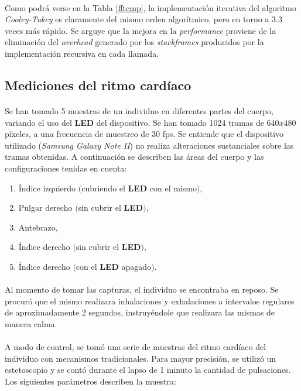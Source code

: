 \documentclass[12pt, twocolumn]{article}
\begin{document}
	\paragraph{} Como podrá verse en la Tabla \ref{fftcmp}, la implementación iterativa del algoritmo \textit{Cooley-Tukey} es claramente del mismo orden algorítmico, pero en torno a $3.3$ veces más rápido. Se arguye que la mejora en la \textit{performance} proviene de la eliminación del \textit{overhead} generado por los \textit{stackframes} producidos por la implementación recursiva en cada llamada.
	
	
	\subsection{Mediciones del ritmo cardíaco}
	
	\paragraph{} Se han tomado 5 muestras de un individuo en diferentes partes del cuerpo, variando el uso del \textbf{LED} del dispositivo. Se han tomado 1024 tramas de $640x480$ píxeles, a una frecuencia de muestreo de 30 fps. Se entiende que el dispositivo utilizado (\textit{Samsung Galaxy Note II}) no realiza alteraciones sustanciales sobre las tramas obtenidas. A continuación se describen las áreas del cuerpo y las configuraciones tenidas en cuenta:
	
	\begin{enumerate}
		\item Índice izquierdo $($cubriendo el \textbf{LED} con el mismo$)$,
		\item Pulgar derecho $($sin cubrir el \textbf{LED}$)$,
		\item Antebrazo,
		\item Índice derecho $($sin cubrir el \textbf{LED}$)$,
		\item Índice derecho $($con el \textbf{LED} apagado$)$.
	\end{enumerate}
	
	\paragraph{} Al momento de tomar las capturas, el individuo se encontraba en reposo. Se procuró que el mismo realizara inhalaciones y exhalaciones a intervalos regulares de aproximadamente 2 segundos, instruyéndole que realizara las mismas de manera calma.
	
	\paragraph{} A modo de control, se tomó una serie de muestras del ritmo cardíaco del individuo con mecanismos tradicionales. Para mayor precisión, se utilizó un estetoscopio y se contó durante el lapso de 1 minuto la cantidad de pulsaciones. Los siguientes parámetros describen la muestra:
	
\end{document}
